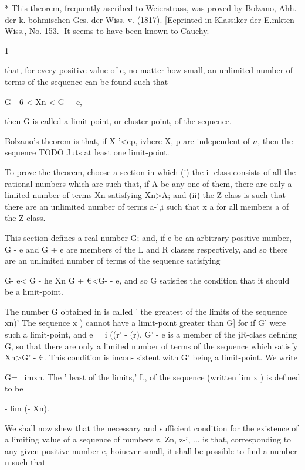 * This theorem, frequently ascribed to Weierstrass, was proved by
Bolzano, Ahh. der k. bohmischen Ges. der Wiss. v. (1817). [Eeprinted
in Klassiker der E.mkten Wiss., No. 153.] It seems to have been known
to Cauchy.

1-

%
%

that, for every positive value of e, no matter how small, an unlimited
number of terms of the sequence can be found such that

G - 6 < Xn < G + e,

then G is called a limit-point, or cluster-point, of the sequence.

Bolzano's theorem is that, if X '<cp, ivhere X, p are independent of
$n$, then the sequence TODO Juts at least one limit-point.

To prove the theorem, choose a section in which (i) the i -class
consists of all the rational numbers which are such that, if A be any
one of them, there are only a limited number of terms Xn satisfying
Xn>A; and (ii) the Z-class is such that there are an unlimited number
of terms a-',i such that x a for all members a of the Z-class.

This section defines a real number G; and, if e be an arbitrary
positive number, G - e and G + e are members of the L and R classes
respectively, and so there are an unlimited number of terms of the
sequence satisfying

G- e< G - he Xn G + €<G- - e, and so G satisfies the condition that it
should be a limit-point.


The number G obtained in  is called ' the greatest of the limits
of the sequence xn)' The sequence x ) cannot have a limit-point
greater than G] for if G' were such a limit-point, and e = i ((r' -
(r), G' - e is a member of the jR-class defining G, so that there are
only a limited number of terms of the sequence which satisfy Xn>G' -
€. This condition is incon- sistent with G' being a limit-point. We
write

G= \ imxn. The ' least of the limits,' L, of the sequence (written lim
x ) is defined to be

- lim (- Xn).


We shall now shew that the necessary and sufficient condition for the
existence of a limiting value of a sequence of numbers z, Zn, z-i,
... is that, corresponding to any given positive number e, hoiuever
small, it shall be possible to find a number n such that

